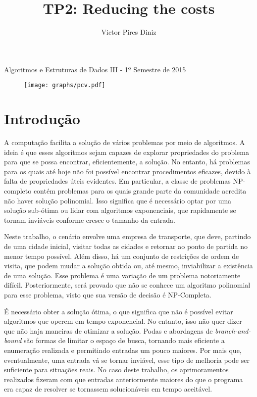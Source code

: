 \documentclass[10pt,a4paper]{article}
\title{TP2: Reducing the costs}
\author{Victor Pires Diniz}
\numberwithin{equation}{section}
\begin{document}
\maketitle
\begin{center}
Algoritmos e Estruturas de Dados III - 1º Semestre de 2015
\end{center}

\begin{figure}[H]
    \centering
    \texttt{[image: graphs/pcv.pdf]}
    \label{fig:replselection}
\end{figure}

\section{Introdução}

A computação facilita a solução de vários problemas por meio de algoritmos. A ideia é que esses algoritmos sejam capazes de explorar propriedades do problema para que se possa encontrar, eficientemente, a solução. No entanto, há problemas para os quais até hoje não foi possível encontrar procedimentos eficazes, devido à falta de propriedades úteis evidentes. Em particular, a classe de problemas NP-completo contém problemas para os quais grande parte da comunidade acredita não haver solução polinomial. Isso significa que é necessário optar por uma solução sub-ótima ou lidar com algoritmos exponenciais, que rapidamente se tornam inviáveis conforme cresce o tamanho da entrada.

Neste trabalho, o cenário envolve uma empresa de transporte, que deve, partindo de uma cidade inicial, visitar todas as cidades e retornar ao ponto de partida no menor tempo possível. Além disso, há um conjunto de restrições de ordem de visita, que podem mudar a solução obtida ou, até mesmo, inviabilizar a existência de uma solução. Esse problema é uma variação de um problema notoriamente difícil. Posteriormente, será provado que não se conhece um algoritmo polinomial para esse problema, visto que sua versão de decisão é NP-Completa.

É necessário obter a solução ótima, o que significa que não é possível evitar algoritmos que operem em tempo exponencial. No entanto, isso não quer dizer que não haja maneiras de otimizar a solução. Podas e abordagens de \emph{branch-and-bound} são formas de limitar o espaço de busca, tornando mais eficiente a enumeração realizada e permitindo entradas um pouco maiores. Por mais que, eventualmente, uma entrada vá se tornar inviável, esse tipo de melhoria pode ser suficiente para situações reais. No caso deste trabalho, os aprimoramentos realizados fizeram com que entradas anteriormente maiores do que o programa era capaz de resolver se tornassem solucionáveis em tempo aceitável.
\end{document}
